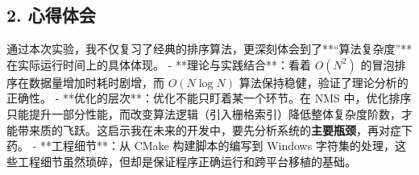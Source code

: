 \documentclass[a4paper,12pt]{ctexart}
\begin{document}
\subsection{2. 心得体会}
通过本次实验，我不仅复习了经典的排序算法，更深刻体会到了**“算法复杂度”**在实际运行时间上的具体体现。
- **理论与实践结合**：看着 $O(N^2)$ 的冒泡排序在数据量增加时耗时剧增，而 $O(N \log N)$ 算法保持稳健，验证了理论分析的正确性。
- **优化的层次**：优化不能只盯着某一个环节。在 NMS 中，优化排序只能提升一部分性能，而改变算法逻辑（引入栅格索引）降低整体复杂度阶数，才能带来质的飞跃。这启示我在未来的开发中，要先分析系统的\textbf{主要瓶颈}，再对症下药。
- **工程细节**：从 CMake 构建脚本的编写到 Windows 字符集的处理，这些工程细节虽然琐碎，但却是保证程序正确运行和跨平台移植的基础。
\end{document}

